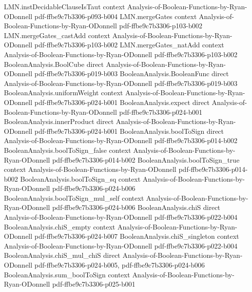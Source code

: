 \begin{lemma}
  {LMN.instDecidableClauseIsTaut}
  {context}
  {Analysis-of-Boolean-Functions-by-Ryan-ODonnell}
  {pdf-ffbe9c7b3306-p093-b004}
\proofstep
  {LMN.mergeGates}
  {context}
  {Analysis-of-Boolean-Functions-by-Ryan-ODonnell}
  {pdf-ffbe9c7b3306-p103-b002}
\proofstep
  {LMN.mergeGates_castAdd}
  {context}
  {Analysis-of-Boolean-Functions-by-Ryan-ODonnell}
  {pdf-ffbe9c7b3306-p103-b002}
\proofstep
  {LMN.mergeGates_natAdd}
  {context}
  {Analysis-of-Boolean-Functions-by-Ryan-ODonnell}
  {pdf-ffbe9c7b3306-p103-b002}
\proofstep
  {BooleanAnalysis.BoolCube}
  {direct}
  {Analysis-of-Boolean-Functions-by-Ryan-ODonnell}
  {pdf-ffbe9c7b3306-p019-b003}
\proofstep
  {BooleanAnalysis.BooleanFunc}
  {direct}
  {Analysis-of-Boolean-Functions-by-Ryan-ODonnell}
  {pdf-ffbe9c7b3306-p019-b003}
\proofstep
  {BooleanAnalysis.uniformWeight}
  {context}
  {Analysis-of-Boolean-Functions-by-Ryan-ODonnell}
  {pdf-ffbe9c7b3306-p024-b001}
\proofstep
  {BooleanAnalysis.expect}
  {direct}
  {Analysis-of-Boolean-Functions-by-Ryan-ODonnell}
  {pdf-ffbe9c7b3306-p024-b001}
\proofstep
  {BooleanAnalysis.innerProduct}
  {direct}
  {Analysis-of-Boolean-Functions-by-Ryan-ODonnell}
  {pdf-ffbe9c7b3306-p024-b001}
\proofstep
  {BooleanAnalysis.boolToSign}
  {direct}
  {Analysis-of-Boolean-Functions-by-Ryan-ODonnell}
  {pdf-ffbe9c7b3306-p014-b002}
\proofstep
  {BooleanAnalysis.boolToSign_false}
  {context}
  {Analysis-of-Boolean-Functions-by-Ryan-ODonnell}
  {pdf-ffbe9c7b3306-p014-b002}
\proofstep
  {BooleanAnalysis.boolToSign_true}
  {context}
  {Analysis-of-Boolean-Functions-by-Ryan-ODonnell}
  {pdf-ffbe9c7b3306-p014-b002}
\proofstep
  {BooleanAnalysis.boolToSign_sq}
  {context}
  {Analysis-of-Boolean-Functions-by-Ryan-ODonnell}
  {pdf-ffbe9c7b3306-p024-b006}
\proofstep
  {BooleanAnalysis.boolToSign_mul_self}
  {context}
  {Analysis-of-Boolean-Functions-by-Ryan-ODonnell}
  {pdf-ffbe9c7b3306-p024-b006}
\proofstep
  {BooleanAnalysis.chiS}
  {direct}
  {Analysis-of-Boolean-Functions-by-Ryan-ODonnell}
  {pdf-ffbe9c7b3306-p022-b004}
\proofstep
  {BooleanAnalysis.chiS_empty}
  {context}
  {Analysis-of-Boolean-Functions-by-Ryan-ODonnell}
  {pdf-ffbe9c7b3306-p024-b007}
\proofstep
  {BooleanAnalysis.chiS_singleton}
  {context}
  {Analysis-of-Boolean-Functions-by-Ryan-ODonnell}
  {pdf-ffbe9c7b3306-p022-b004}
\proofstep
  {BooleanAnalysis.chiS_mul_chiS}
  {direct}
  {Analysis-of-Boolean-Functions-by-Ryan-ODonnell}
  {pdf-ffbe9c7b3306-p024-b005,
    pdf-ffbe9c7b3306-p024-b006}
\proofstep
  {BooleanAnalysis.sum_boolToSign}
  {context}
  {Analysis-of-Boolean-Functions-by-Ryan-ODonnell}
  {pdf-ffbe9c7b3306-p025-b001}

\end{lemma}

